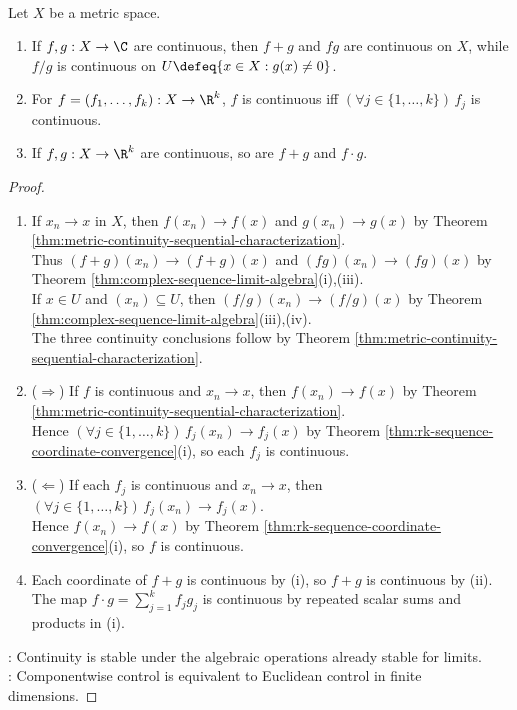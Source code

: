 \begin{theorem} \label{thm:continuous-algebra-and-components} \\
Let $X$ be a metric space.
\begin{enumerate}[label=(\roman*)]
\setlength{\itemsep}{0pt}
\item If $f,g:X\to\C$ are continuous, then $f+g$ and $fg$ are continuous on $X$, while $f/g$ is continuous on $U\defeq\{x\in X:g(x)\neq0\}$.
\item For $f=(f_1,\ldots,f_k):X\to\R^k$, $f$ is continuous iff $(\forall j\in\{1,\ldots,k\})\,f_j$ is continuous.
\item If $f,g:X\to\R^k$ are continuous, so are $f+g$ and $f\cdot g$.
\end{enumerate}
\begin{proof}
\begin{enumerate}[label=(\roman*)]
\setlength{\itemsep}{0pt}
\item[$(i)$] If $x_n\to x$ in $X$, then $f(x_n)\to f(x)$ and $g(x_n)\to g(x)$ by Theorem \ref{thm:metric-continuity-sequential-characterization}.\\
Thus $(f+g)(x_n)\to(f+g)(x)$ and $(fg)(x_n)\to(fg)(x)$ by Theorem \ref{thm:complex-sequence-limit-algebra}(i),(iii).\\
If $x\in U$ and $(x_n)\subseteq U$, then $(f/g)(x_n)\to(f/g)(x)$ by Theorem \ref{thm:complex-sequence-limit-algebra}(iii),(iv).\\
The three continuity conclusions follow by Theorem \ref{thm:metric-continuity-sequential-characterization}.
\item[$(ii)$] ($\Rightarrow$) If $f$ is continuous and $x_n\to x$, then $f(x_n)\to f(x)$ by Theorem \ref{thm:metric-continuity-sequential-characterization}.\\
Hence $(\forall j\in\{1,\ldots,k\})\,f_j(x_n)\to f_j(x)$ by Theorem \ref{thm:rk-sequence-coordinate-convergence}(i), so each $f_j$ is continuous.
\item[$(ii)$] ($\Leftarrow$) If each $f_j$ is continuous and $x_n\to x$, then $(\forall j\in\{1,\ldots,k\})\,f_j(x_n)\to f_j(x)$.\\
Hence $f(x_n)\to f(x)$ by Theorem \ref{thm:rk-sequence-coordinate-convergence}(i), so $f$ is continuous.
\item[$(iii)$] Each coordinate of $f+g$ is continuous by (i), so $f+g$ is continuous by (ii).\\
The map $f\cdot g=\sum\limits_{j=1}^k f_jg_j$ is continuous by repeated scalar sums and products in (i).
\end{enumerate}
: Continuity is stable under the algebraic operations already stable for limits.\\
: Componentwise control is equivalent to Euclidean control in finite dimensions.
\end{proof}
\end{theorem}

